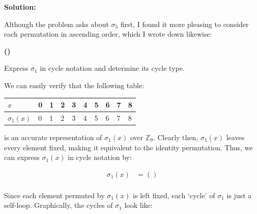 \documentclass{article}
\newenvironment{solution}{
	\vspace{.5em}
	\par
	\begin{adjustwidth}{1.5em}{}
	\textbf{{Solution:}}
	\par
	\vspace{.5em}
}{
	\vspace{1em}
	\end{adjustwidth}
	\setcounter{step}{0}
}
\newcounter{step}
\renewcommand{\thestep}{\Roman{step}}
\newenvironment{step}{
	\refstepcounter{step}
	\vspace{1em}\par\noindent
	\ignorespaces\noindent\textbf{(\thestep)}
	\ignorespaces
}{
	\par
	\vspace{1.5em}
}
\newcounter{problem}
\begin{document}
\begin{solution}
	Although the problem asks about $\sigma_{5}$ first, I found it more pleasing to consider each permutation in ascending order, which I wrote down likewise:

	\begin{step}
		Express $\sigma_{1}$ in cycle notation and determine its cycle type.
	\end{step}

	We can easily verify that the following table:

	\vspace{2em}

	\begin{tabularx}{\linewidth}{Y | *{9}{Y}}
		$x$ & 0 & 1 & 2 & 3 & 4 & 5 & 6 & 7 & 8 \\
		\hline
		$\sigma_{1}(x)$ & 0 & 1 & 2 & 3 & 4 & 5 & 6 & 7 & 8 \\
	\end{tabularx}

	\vspace{2em}
	
	is an accurate representation of $\sigma_{1}(x)$ over $\mathbb{Z}_{9}$. Clearly then, $\sigma_{1}(x)$ leaves every element fixed, making it equivalent to the identity permutation. Thus, we can express $\sigma_{1}(x)$ in cycle notation by:

	\begin{align*}
		\sigma_{1}(x) &= () \\
	\end{align*}

	Since each element permuted by $\sigma_{1}(x)$ is left fixed, each `cycle' of $\sigma_{1}$ is just a self-loop. Graphically, the cycles of $\sigma_{1}$ look like:

	\vspace{2em}

	\begin{center}
	\end{center}


\end{solution}
\end{document}

